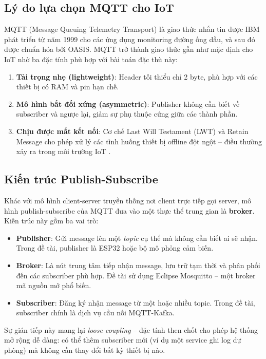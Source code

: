 \subsection{Lý do lựa chọn MQTT cho IoT}

MQTT (Message Queuing Telemetry Transport) là giao thức nhắn tin được IBM phát triển từ năm 1999 cho các ứng dụng monitoring đường ống dầu, và sau đó được chuẩn hóa bởi OASIS. MQTT trở thành giao thức gần như mặc định cho IoT nhờ ba đặc tính phù hợp với bài toán đặc thù này:

\begin{enumerate}
  \item \textbf{Tải trọng nhẹ (lightweight)}: Header tối thiểu chỉ 2 byte, phù hợp với các thiết bị có RAM và pin hạn chế.
  \item \textbf{Mô hình bất đối xứng (asymmetric)}: Publisher không cần biết về subscriber và ngược lại, giảm sự phụ thuộc cứng giữa các thành phần.
  \item \textbf{Chịu được mất kết nối}: Cơ chế Last Will Testament (LWT) và Retain Message cho phép xử lý các tình huống thiết bị offline đột ngột – điều thường xảy ra trong môi trường IoT \cite{guo2019}.
\end{enumerate}

\subsection{Kiến trúc Publish-Subscribe}

Khác với mô hình client-server truyền thống nơi client trực tiếp gọi server, mô hình publish-subscribe của MQTT đưa vào một thực thể trung gian là \textbf{broker}. Kiến trúc này gồm ba vai trò:

\begin{itemize}
  \item \textbf{Publisher}: Gửi message lên một \textit{topic} cụ thể mà không cần biết ai sẽ nhận. Trong đề tài, publisher là ESP32 hoặc bộ mô phỏng cảm biến.
  \item \textbf{Broker}: Là nút trung tâm tiếp nhận message, lưu trữ tạm thời và phân phối đến các subscriber phù hợp. Đề tài sử dụng Eclipse Mosquitto – một broker mã nguồn mở phổ biến.
  \item \textbf{Subscriber}: Đăng ký nhận message từ một hoặc nhiều topic. Trong đề tài, subscriber chính là dịch vụ cầu nối MQTT-Kafka.
\end{itemize}

Sự gián tiếp này mang lại \textit{loose coupling} – đặc tính then chốt cho phép hệ thống mở rộng dễ dàng: có thể thêm subscriber mới (ví dụ một service ghi log dự phòng) mà không cần thay đổi bất kỳ thiết bị nào.

